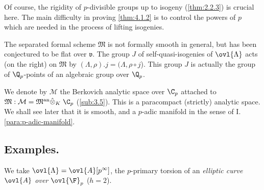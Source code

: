 Of course, the rigidity of $p$-divisible groups up to isogeny (\ref{thm:2.2.3}) is
crucial here. The main difficulty in proving \ref{thm:4.1.2} is to control the
powers of $p$ which are needed in the process of lifting isogenies.


The separated formal scheme $\mathfrak{M}$ is not formally smooth in
general, but has been conjectured to be flat over 
$\mathfrak{v}$.  The group $J$ of self-quasi-isogenies of $\ovl{\Lambda}$
 acts (on the right) on $\mathfrak{M}$ by  $(\Lambda,\rho).j= 
(\Lambda,\rho\circ j$). This group $J$ is actually the group of
 ${\Q}_p$-points of an algebraic group over ${\Q}_p$. 

 We denote by $\mathcal{M}$ the Berkovich analytic space over
 $\C_p$ attached to $\mathfrak{M} : 
 \mathcal{M}={\mathfrak{M}}^{\mathrm{an}}\hat\otimes_K\;\C_p$
 (\cf \ref{sub:3.5}). This is a paracompact (strictly) analytic space. We shall
 see later that it is smooth, and a $p$-adic manifold in the sense of
 I.\ref{para:p-adic-manifold}.

\subsection{Examples.}\label{sub:4.2}
 We take $\ovl{\Lambda} ={\ovl{A}}[p^\infty]$, the $p$-primary
 torsion of an {\it elliptic curve ${\ovl{A}}$ over ${\ovl{\F}}_p$} ($h=2$).

